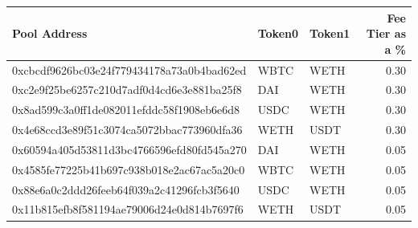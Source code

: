 \begin{table}[!htb]
    \begin{tabular}{|l|l|l|r|}
        \hline
                                      Pool Address & Token0 & Token1 &  Fee Tier as a \% \\\hline\hline
        0xcbcdf9626bc03e24f779434178a73a0b4bad62ed &   WBTC &   WETH &     0.30 \\\hline
        0xc2e9f25be6257c210d7adf0d4cd6e3e881ba25f8 &    DAI &   WETH &     0.30 \\\hline
        0x8ad599c3a0ff1de082011efddc58f1908eb6e6d8 &   USDC &   WETH &     0.30 \\\hline
        0x4e68ccd3e89f51c3074ca5072bbac773960dfa36 &   WETH &   USDT &     0.30 \\\hline
        0x60594a405d53811d3bc4766596efd80fd545a270 &    DAI &   WETH &     0.05 \\\hline
        0x4585fe77225b41b697c938b018e2ac67ac5a20c0 &   WBTC &   WETH &     0.05 \\\hline
        0x88e6a0c2ddd26feeb64f039a2c41296fcb3f5640 &   USDC &   WETH &     0.05 \\\hline
        0x11b815efb8f581194ae79006d24e0d814b7697f6 &   WETH &   USDT &     0.05 \\\hline
    \end{tabular}
\end{table}

